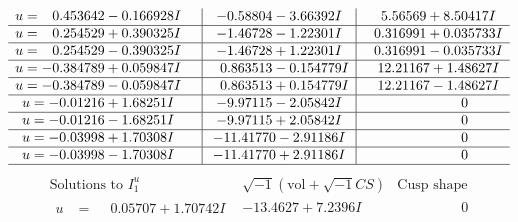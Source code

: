 \documentclass[1p]{elsarticle_modified}
\theoremstyle{definition}
\newcommand{\I}{\sqrt{-1}}
\begin{document}
$$\begin{array}{c|c|c}
\begin{aligned}
u &= \phantom{-}0.453642 - 0.166928 I\end{aligned}
 & -0.58804 - 3.66392 I & \phantom{-}5.56569 + 8.50417 I \\ \hline\begin{aligned}
u &= \phantom{-}0.254529 + 0.390325 I\end{aligned}
 & -1.46728 - 1.22301 I & \phantom{-}0.316991 + 0.035733 I \\ \hline\begin{aligned}
u &= \phantom{-}0.254529 - 0.390325 I\end{aligned}
 & -1.46728 + 1.22301 I & \phantom{-}0.316991 - 0.035733 I \\ \hline\begin{aligned}
u &= -0.384789 + 0.059847 I\end{aligned}
 & \phantom{-}0.863513 - 0.154779 I & \phantom{-}12.21167 + 1.48627 I \\ \hline\begin{aligned}
u &= -0.384789 - 0.059847 I\end{aligned}
 & \phantom{-}0.863513 + 0.154779 I & \phantom{-}12.21167 - 1.48627 I \\ \hline\begin{aligned}
u &= -0.01216 + 1.68251 I\end{aligned}
 & -9.97115 - 2.05842 I & \phantom{-0.000000 } 0 \\ \hline\begin{aligned}
u &= -0.01216 - 1.68251 I\end{aligned}
 & -9.97115 + 2.05842 I & \phantom{-0.000000 } 0 \\ \hline\begin{aligned}
u &= -0.03998 + 1.70308 I\end{aligned}
 & -11.41770 - 2.91186 I & \phantom{-0.000000 } 0 \\ \hline\begin{aligned}
u &= -0.03998 - 1.70308 I\end{aligned}
 & -11.41770 + 2.91186 I & \phantom{-0.000000 } 0\\
 \hline 
 \end{array}$$\newpage$$\begin{array}{c|c|c}  
\text{Solutions to }I^u_{1}& \I (\text{vol} + \sqrt{-1}CS) & \text{Cusp shape}\\
 \hline 
\begin{aligned}
u &= \phantom{-}0.05707 + 1.70742 I\end{aligned}
 & -13.4627 + 7.2396 I & \phantom{-0.000000 } 0 \\ \hline\begin{aligned}

\end{aligned}
\end{array}$$
\end{document}
